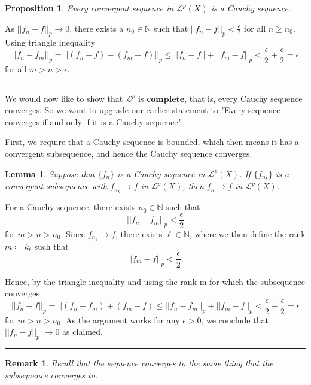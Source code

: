 \documentclass[twoside]{article}
\newtheorem{lemma}[theorem]{Lemma}
\newtheorem{proposition}[theorem]{Proposition}
\newtheorem{remark}[theorem]{Remark}
\newenvironment{proof}{{\bf Proof:}}{\hfill\rule{2mm}{2mm}}
\begin{document}
\begin{proposition}Every convergent sequence in $\mathcal{L}^p(X)$ is a Cauchy sequence.
\end{proposition}

\begin{proof}As $||f_n - f||_p \rightarrow 0$, there exists a $n_0 \in \mathbb{N}$ such that $||f_n - f||_p < \frac{\epsilon}{2}$ for all $n \geq n_0$. Using triangle inequality
$$
||f_n - f_m ||_p = ||(f_n - f) - (f_m - f)||_p \leq ||f_n - f|| + ||f_m - f||_p < \frac{\epsilon}{2} + \frac{\epsilon}{2} = \epsilon
$$
for all $m > n > \epsilon$. 
\end{proof}

We would now like to show that $\mathcal{L}^p$ is $\textbf{complete}$, that is, every Cauchy sequence converges. So we want to upgrade our earlier statement to "Every sequence converges if and only if it is a Cauchy sequence". 

First, we require that a Cauchy sequence is bounded, which then means it has a convergent subsequence, and hence the Cauchy sequence converges.

\begin{lemma}Suppose that $\{f_n\}$ is a Cauchy sequence in $\mathcal{L}^p(X)$. If $\{f_{n_k}\}$ is a convergent subsequence with $f_{n_k} \rightarrow f$ in $\mathcal{L}^p(X)$, then $f_n \rightarrow f$ in $\mathcal{L}^p(X)$.
\end{lemma}

\begin{proof}
For a Cauchy sequence, there exists $n_0 \in \mathbb{N}$ such that
$$
||f_n - f_m||_p < \frac{\epsilon}{2}
$$
for $m > n > n_0$. Since $f_{n_k} \rightarrow f$, there exists $\ell \in \mathbb{N}$, where we then define the rank $m \coloneqq k_{\ell}$ such that 
$$
||f_m - f||_p < \frac{\epsilon}{2}.
$$

Hence, by the triangle inequality and using the rank m for which the subsequence converges
$$
||f_n - f||_p = ||(f_n - f_m) + (f_m - f) \leq ||f_n - f_m||_p + ||f_m - f||_p  < \frac{\epsilon}{2} + \frac{\epsilon}{2} = \epsilon
$$
for $m > n > n_0$. As the argument works for any $\epsilon > 0$, we conclude that $||f_n - f||_p \;\rightarrow 0$ as claimed.
\end{proof}

\begin{remark} Recall that the sequence converges to the same thing that the subsequence converges to.
\end{remark}
\end{document}
